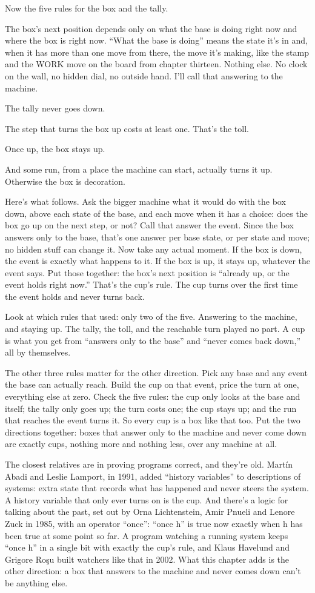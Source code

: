 \documentclass[11pt,twoside]{article}
\theoremstyle{thielethm}
\theoremstyle{thieledef}
\theoremstyle{thieledef}
\theoremstyle{thieledef}
\theoremstyle{thielethm}
\theoremstyle{thieleobs}
\theoremstyle{thielethm}
\begin{document}
Now the five rules for the box and the tally.

The box's next position depends only on what the base is doing right now and where the box is right now. ``What the base is doing'' means the state it's in and, when it has more than one move from there, the move it's making, like the stamp and the WORK move on the board from chapter thirteen. Nothing else. No clock on the wall, no hidden dial, no outside hand. I'll call that answering to the machine.

The tally never goes down.

The step that turns the box up costs at least one. That's the toll.

Once up, the box stays up.

And some run, from a place the machine can start, actually turns it up. Otherwise the box is decoration.

Here's what follows. Ask the bigger machine what it would do with the box down, above each state of the base, and each move when it has a choice: does the box go up on the next step, or not? Call that answer the event. Since the box answers only to the base, that's one answer per base state, or per state and move; no hidden stuff can change it. Now take any actual moment. If the box is down, the event is exactly what happens to it. If the box is up, it stays up, whatever the event says. Put those together: the box's next position is ``already up, or the event holds right now.'' That's the cup's rule. The cup turns over the first time the event holds and never turns back.

Look at which rules that used: only two of the five. Answering to the machine, and staying up. The tally, the toll, and the reachable turn played no part. A cup is what you get from ``answers only to the base'' and ``never comes back down,'' all by themselves.

The other three rules matter for the other direction. Pick any base and any event the base can actually reach. Build the cup on that event, price the turn at one, everything else at zero. Check the five rules: the cup only looks at the base and itself; the tally only goes up; the turn costs one; the cup stays up; and the run that reaches the event turns it. So every cup is a box like that too. Put the two directions together: boxes that answer only to the machine and never come down are exactly cups, nothing more and nothing less, over any machine at all.

The closest relatives are in proving programs correct, and they're old. Martín Abadi and Leslie Lamport, in 1991, added ``history variables'' to descriptions of systems: extra state that records what has happened and never steers the system. A history variable that only ever turns on is the cup. And there's a logic for talking about the past, set out by Orna Lichtenstein, Amir Pnueli and Lenore Zuck in 1985, with an operator ``once'': ``once h'' is true now exactly when h has been true at some point so far. A program watching a running system keeps ``once h'' in a single bit with exactly the cup's rule, and Klaus Havelund and Grigore Roşu built watchers like that in 2002. What this chapter adds is the other direction: a box that answers to the machine and never comes down can't be anything else.
\end{document}
